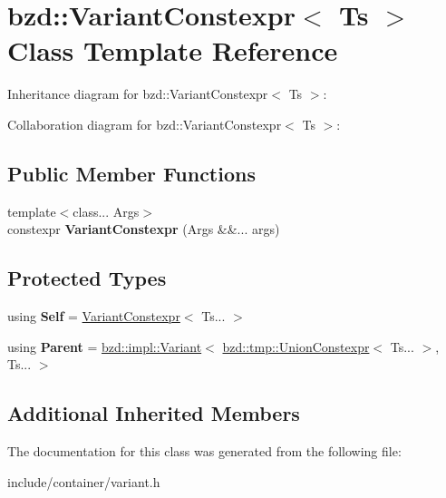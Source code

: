 \hypertarget{classbzd_1_1VariantConstexpr}{}\section{bzd\+:\+:Variant\+Constexpr$<$ Ts $>$ Class Template Reference}
\label{classbzd_1_1VariantConstexpr}


Inheritance diagram for bzd\+:\+:Variant\+Constexpr$<$ Ts $>$\+:


Collaboration diagram for bzd\+:\+:Variant\+Constexpr$<$ Ts $>$\+:
\subsection*{Public Member Functions}
\begin{DoxyCompactItemize}
\item 
\mbox{\label{classbzd_1_1VariantConstexpr_a68f73d3edd90ed27c20c2e95ccc7e5ab}} 
{\footnotesize template$<$class... Args$>$ }\\constexpr {\bfseries Variant\+Constexpr} (Args \&\&... args)
\end{DoxyCompactItemize}
\subsection*{Protected Types}
\begin{DoxyCompactItemize}
\item 
\mbox{\label{classbzd_1_1VariantConstexpr_a2cfe0c39021f2c190c6ecf5bbca44ed3}} 
using {\bfseries Self} = \hyperlink{classbzd_1_1VariantConstexpr}{Variant\+Constexpr}$<$ Ts... $>$
\item 
\mbox{\label{classbzd_1_1VariantConstexpr_a233f6fce716fa83b0481450f5387c546}} 
using {\bfseries Parent} = \hyperlink{classbzd_1_1impl_1_1Variant}{bzd\+::impl\+::\+Variant}$<$ \hyperlink{unionbzd_1_1tmp_1_1impl_1_1UnionConstexpr}{bzd\+::tmp\+::\+Union\+Constexpr}$<$ Ts... $>$, Ts... $>$
\end{DoxyCompactItemize}
\subsection*{Additional Inherited Members}


The documentation for this class was generated from the following file\+:\begin{DoxyCompactItemize}
\item 
include/container/variant.\+h\end{DoxyCompactItemize}
